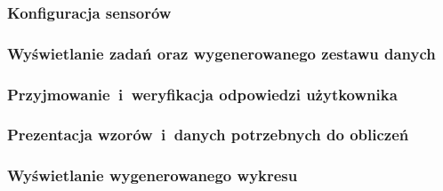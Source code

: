 \endgroup

\subsubsection{Konfiguracja sensorów}


\subsubsection{Wyświetlanie zadań oraz wygenerowanego zestawu danych}



\subsubsection{Przyjmowanie~i~weryfikacja odpowiedzi użytkownika}



\subsubsection{Prezentacja wzorów~i~danych potrzebnych do obliczeń}



\subsubsection{Wyświetlanie wygenerowanego wykresu}

